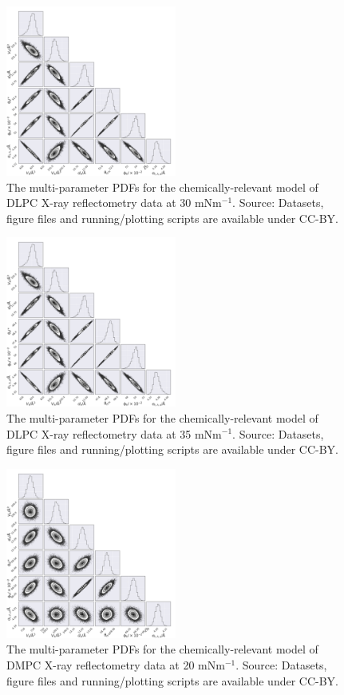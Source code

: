 \documentclass[11pt,a4paper]{article}
\begin{document}
\begin{figure}[h]
	\centering
	\includegraphics[width=0.50\textwidth]{figures/dlpc4_all_corner}
	\caption{The multi-parameter PDFs for the chemically-relevant model of DLPC X-ray reflectometry data at 30 mNm$^{-1}$. Source: Datasets, figure files and running/plotting scripts are available under CC-BY.\cite{mccluskey_2018}}
	\label{fig:dlpc4}
\end{figure}
\begin{figure}
	\centering
	\includegraphics[width=0.50\textwidth]{figures/dlpc5_all_corner}
	\caption{The multi-parameter PDFs for the chemically-relevant model of DLPC X-ray reflectometry data at 35 mNm$^{-1}$. Source: Datasets, figure files and running/plotting scripts are available under CC-BY.\cite{mccluskey_2018}}
	\label{fig:dlpc5}
\end{figure}
\begin{figure}[h]
	\centering
	\includegraphics[width=0.50\textwidth]{figures/dmpc2_all_corner}
	\caption{The multi-parameter PDFs for the chemically-relevant model of DMPC X-ray reflectometry data at 20 mNm$^{-1}$. Source: Datasets, figure files and running/plotting scripts are available under CC-BY.\cite{mccluskey_2018}}
	\label{fig:dmpc2}
\end{figure}
\end{document}
